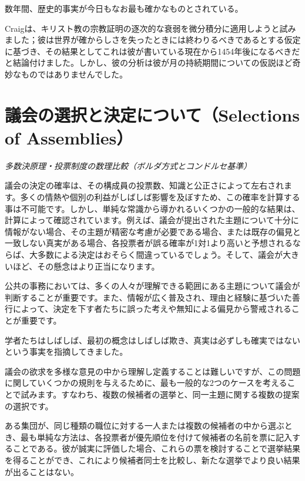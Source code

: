 \documentclass[a4paper,11pt,openany]{ltjsbook}
\begin{document}
数年間、歴史的事実が今日もなお最も確かなものとされている。

Craigは、キリスト教の宗教証明の逐次的な衰弱を微分積分に適用しようと試みました；彼は世界が確からしさを失ったときには終わりるべきであるとする仮定に基づき、その結果としてこれは彼が書いている現在から1454年後になるべきだと結論付けました。しかし、彼の分析は彼が月の持続期間についての仮説ほど奇妙なものではありませんでした。

\newpage

\chapter{議会の選択と決定について（Selections of Assemblies）}
\label{ch:xii}

\begin{center}
\large\textit{多数決原理・投票制度の数理比較（ボルダ方式とコンドルセ基準）}
\end{center}
\vspace{4mm}

議会の決定の確率は、その構成員の投票数、知識と公正さによって左右されます。多くの情熱や個別の利益がしばしば影響を及ぼすため、この確率を計算する事は不可能です。しかし、単純な常識から導かれるいくつかの一般的な結果は、計算によって確認されています。例えば、議会が提出された主題について十分に情報がない場合、その主題が精密な考慮が必要である場合、または既存の偏見と一致しない真実がある場合、各投票者が誤る確率が1対1より高いと予想されるならば、大多数による決定はおそらく間違っているでしょう。そして、議会が大きいほど、その懸念はより正当になります。

公共の事務においては、多くの人々が理解できる範囲にある主題について議会が判断することが重要です。また、情報が広く普及され、理由と経験に基づいた善行によって、決定を下す者たちに誤った考えや無知による偏見から警戒されることが重要です。

学者たちはしばしば、最初の概念はしばしば欺き、真実は必ずしも確実ではないという事実を指摘してきました。

議会の欲求を多様な意見の中から理解し定義することは難しいですが、この問題に関していくつかの規則を与えるために、最も一般的な2つのケースを考えることで試みます。すなわち、複数の候補者の選挙と、同一主題に関する複数の提案の選択です。

ある集団が、同じ種類の職位に対する一人または複数の候補者の中から選ぶとき、最も単純な方法は、各投票者が優先順位を付けて候補者の名前を票に記入することである。彼が誠実に評価した場合、これらの票を検討することで選挙結果を得ることができ、これにより候補者同士を比較し、新たな選挙でより良い結果が出ることはない。
\end{document}
